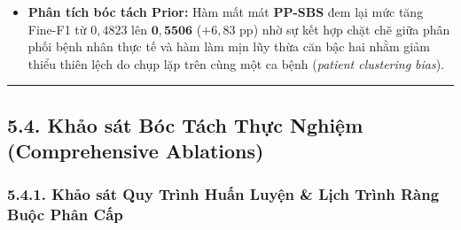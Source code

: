 \documentclass[
  10pt,
  a4paper,
  twocolumn]{article}
\providecommand{\tightlist}{%
  \setlength{\itemsep}{0pt}\setlength{\parskip}{0pt}}
\begin{document}
\begin{itemize}
\tightlist
\item
  \textbf{Phân tích bóc tách Prior:} Hàm mất mát \textbf{PP-SBS} đem lại
  mức tăng Fine-F1 từ \(0{,}4823\) lên \(\mathbf{0{,}5506}\)
  (\(+6{,}83\) pp) nhờ sự kết hợp chặt chẽ giữa phân phối bệnh nhân thực
  tế và hàm làm mịn lũy thừa căn bậc hai nhằm giảm thiểu thiên lệch do
  chụp lặp trên cùng một ca bệnh (\emph{patient clustering bias}).
\end{itemize}

\begin{center}\rule{0.5\linewidth}{0.5pt}\end{center}

\subsection{5.4. Khảo sát Bóc Tách Thực Nghiệm (Comprehensive
Ablations)}\label{khux1ea3o-suxe1t-buxf3c-tuxe1ch-thux1ef1c-nghiux1ec7m-comprehensive-ablations}

\subsubsection{5.4.1. Khảo sát Quy Trình Huấn Luyện \& Lịch Trình Ràng
Buộc Phân
Cấp}\label{khux1ea3o-suxe1t-quy-truxecnh-huux1ea5n-luyux1ec7n-lux1ecbch-truxecnh-ruxe0ng-buux1ed9c-phuxe2n-cux1ea5p}

\begin{table}[htbp]
\centering
\caption{Khảo sát vị trí trích xuất đặc trưng đa tầng: Shared Late-Stage so với Multi-Stage Intermediate Heads.}
\label{tab:table8}
\vspace{2pt}
\end{table}
\end{document}
